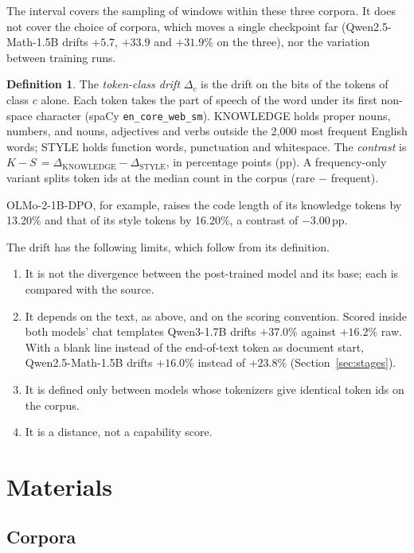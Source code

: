 \documentclass[11pt,a4paper]{article}
\theoremstyle{definition}
\newtheorem*{definition}{Definition}
\newcommand{\KS}{$K\!-\!S$}
\newcommand{\pp}{\,pp}
\begin{document}
\noindent The interval covers the sampling of windows within these three corpora. It does not cover the choice
of corpora, which moves a single checkpoint far (Qwen2.5-Math-1.5B drifts $+5.7$, $+33.9$ and $+31.9\%$ on the
three), nor the variation between training runs.

\begin{definition}
The \emph{token-class drift} $\Delta_c$ is the drift on the bits of the tokens of class $c$ alone. Each token
takes the part of speech of the word under its first non-space character (spaCy \texttt{en\_core\_web\_sm}).
KNOWLEDGE holds proper nouns, numbers, and nouns, adjectives and verbs outside the 2,000 most frequent English
words; STYLE holds function words, punctuation and whitespace. The \emph{contrast} is
\KS{}$\,=\Delta_{\mathrm{KNOWLEDGE}}-\Delta_{\mathrm{STYLE}}$, in percentage points (pp). A frequency-only variant
splits token ids at the median count in the corpus (rare $-$ frequent).
\end{definition}

\noindent OLMo-2-1B-DPO, for example, raises the code length of its knowledge tokens by 13.20\% and that of its
style tokens by 16.20\%, a contrast of $-3.00$\pp.

The drift has the following limits, which follow from its definition.
\begin{enumerate}
\item It is not the divergence between the post-trained model and its base; each is compared with the source.
\item It depends on the text, as above, and on the scoring convention. Scored inside both models' chat templates Qwen3-1.7B drifts
$+37.0\%$ against $+16.2\%$ raw. With a blank line instead of the end-of-text token as document start,
Qwen2.5-Math-1.5B drifts $+16.0\%$ instead of $+23.8\%$ (Section~\ref{sec:stages}).
\item It is defined only between models whose tokenizers give identical token ids on the corpus.
\item It is a distance, not a capability score.
\end{enumerate}

\section{Materials}
\label{sec:materials}

\subsection{Corpora}
\label{sec:corpora}
\end{document}
